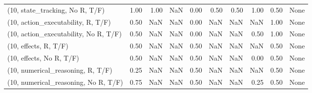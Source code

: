 \begin{table*}[h!]
\begin{adjustbox}{width=2\columnwidth,center}
\begin{tabular}{lrrr|rrr|rrr}
(10, state\_tracking, No R, T/F)       &                      1.00 &                  1.00 &                       NaN &                          0.00 &                      0.50 &                          0.50 &                                   1.00 &                               0.50 &                                  None \\
(10, action\_executability, R, T/F)    &                      0.50 &                   NaN &                       NaN &                          0.00 &                       NaN &                           NaN &                                    NaN &                               1.00 &                                  None \\
(10, action\_executability, No R, T/F) &                      0.50 &                   NaN &                       NaN &                          0.00 &                       NaN &                           NaN &                                   0.50 &                               1.00 &                                  None \\
(10, effects, R, T/F)                 &                      0.50 &                   NaN &                       NaN &                          0.50 &                       NaN &                           NaN &                                    NaN &                               0.50 &                                  None \\
(10, effects, No R, T/F)              &                      0.50 &                   NaN &                       NaN &                          0.50 &                       NaN &                           NaN &                                   0.00 &                               0.50 &                                  None \\
(10, numerical\_reasoning, R, T/F)     &                      0.25 &                   NaN &                       NaN &                          0.50 &                       NaN &                           NaN &                                    NaN &                               0.50 &                                  None \\
(10, numerical\_reasoning, No R, T/F)  &                      0.75 &                   NaN &                       NaN &                          0.50 &                       NaN &                           NaN &                                   0.25 &                               0.50 &                                  None \\

\end{tabular}
\end{adjustbox}
\end{table*}
